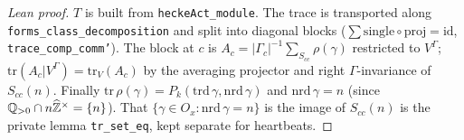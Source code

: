 \begin{proof}[Lean proof]
$T$ is built from \texttt{heckeAct\_module}. The trace is transported along \texttt{forms\_class\_decomposition} and split into diagonal blocks ($\sum\mathrm{single}\circ\mathrm{proj}=\mathrm{id}$, \texttt{trace\_comp\_comm'}). The block at $c$ is $A_c=|\Gamma_c|^{-1}\sum_{S_{cc}}\rho(\gamma)$ restricted to $V^\Gamma$; $\mathrm{tr}(A_c|V^\Gamma)=\mathrm{tr}_V(A_c)$ by the averaging projector and right $\Gamma$-invariance of $S_{cc}(n)$. Finally $\mathrm{tr}\,\rho(\gamma)=P_k(\mathrm{trd}\,\gamma,\mathrm{nrd}\,\gamma)$ and $\mathrm{nrd}\,\gamma=n$ (since $\mathbb{Q}_{>0}\cap n\widehat{\mathbb Z}^\times=\{n\}$). That $\{\gamma\in O_x:\mathrm{nrd}\,\gamma=n\}$ is the image of $S_{cc}(n)$ is the private lemma \texttt{tr\_set\_eq}, kept separate for heartbeats.
\end{proof}

